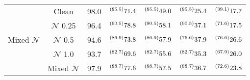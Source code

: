 \begin{table*}[]
\begin{tabular}{cc|c|cccc}
    \multirow{5}{*}{Mixed $\mathcal{N}$}              & Clean                      & 98.0  &  $ \prescript{(85.5)}{}{71.4}$   &   $ \prescript{(85.5)}{}{49.0}$     &    $ \prescript{(85.5)}{}{25.4}$    &   $ \prescript{(39.1)}{}{17.7}$      \\
                                          & $\mathcal{N}$ 0.25                    & 96.4  &  $ \prescript{(90.5)}{}{78.8}$   &   $ \prescript{(90.5)}{}{58.1}$     &    $ \prescript{(90.5)}{}{37.1}$    &   $ \prescript{(71.6)}{}{17.5}$      \\
                                          & $\mathcal{N}$ 0.5                     & 94.6  &  $ \prescript{(86.9)}{}{73.8}$   &   $ \prescript{(86.9)}{}{57.9}$     &    $ \prescript{(76.6)}{}{37.9}$    &   $ \prescript{(76.6)}{}{26.6}$      \\
                                          & $\mathcal{N}$ 1.0                     & 93.7  &  $ \prescript{(82.7)}{}{69.6}$   &   $ \prescript{(82.7)}{}{55.6}$     &    $ \prescript{(82.7)}{}{35.3}$    &   $ \prescript{(67.9)}{}{26.0}$      \\ 
                                          & Mixed $\mathcal{N}$                     & 97.9  &  $ \prescript{(88.7)}{}{77.6}$   &   $ \prescript{(88.7)}{}{57.5}$     &    $ \prescript{(88.7)}{}{36.7}$    &   $ \prescript{(72.6)}{}{23.8}$      \\ \hline

 
  \end{tabular}
\end{table*}

